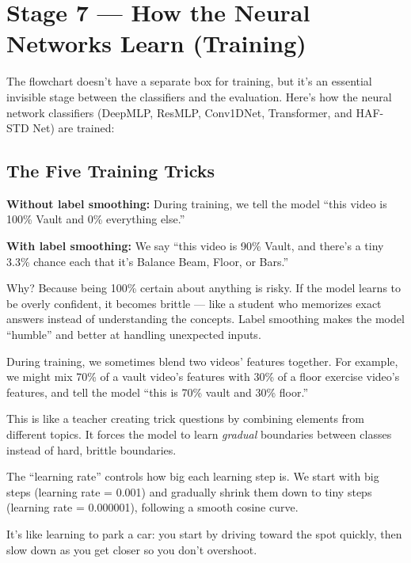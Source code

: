 \documentclass[12pt, a4paper]{article}
\begin{document}
\newpage
\section{Stage 7 — How the Neural Networks Learn (Training)}

The flowchart doesn't have a separate box for training, but it's an essential invisible stage between the classifiers and the evaluation. Here's how the neural network classifiers (DeepMLP, ResMLP, Conv1DNet, Transformer, and HAF-STD Net) are trained:

\subsection{The Five Training Tricks}

\begin{keybox}[1. Label Smoothing ($\epsilon = 0.1$)]
\textbf{Without label smoothing:} During training, we tell the model ``this video is 100\% Vault and 0\% everything else.''

\textbf{With label smoothing:} We say ``this video is 90\% Vault, and there's a tiny 3.3\% chance each that it's Balance Beam, Floor, or Bars.''

Why? Because being 100\% certain about anything is risky. If the model learns to be overly confident, it becomes brittle — like a student who memorizes exact answers instead of understanding the concepts. Label smoothing makes the model ``humble'' and better at handling unexpected inputs.
\end{keybox}

\begin{keybox}[2. Feature-Space Mixup ($\alpha = 0.2$)]
During training, we sometimes blend two videos' features together. For example, we might mix 70\% of a vault video's features with 30\% of a floor exercise video's features, and tell the model ``this is 70\% vault and 30\% floor.''

This is like a teacher creating trick questions by combining elements from different topics. It forces the model to learn \textit{gradual} boundaries between classes instead of hard, brittle boundaries.
\end{keybox}

\begin{keybox}
The ``learning rate'' controls how big each learning step is. We start with big steps (learning rate = 0.001) and gradually shrink them down to tiny steps (learning rate = 0.000001), following a smooth cosine curve.

It's like learning to park a car: you start by driving toward the spot quickly, then slow down as you get closer so you don't overshoot.
\end{keybox}
\end{document}
